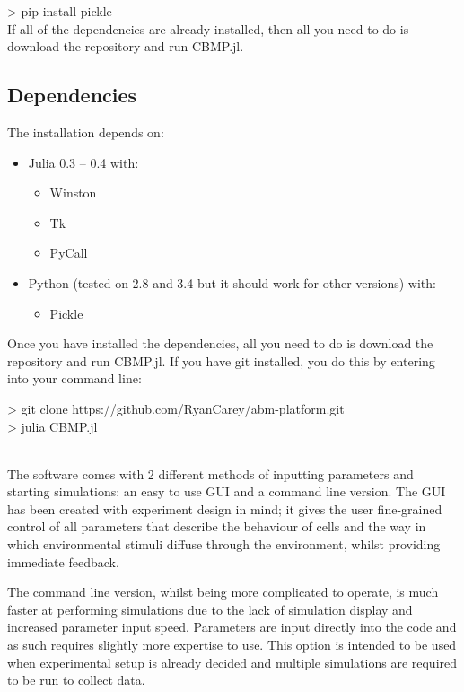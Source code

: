 \documentclass[12pt]{article}
\begin{document}
{\fontsize{11pt}{11pt} \ttfamily 
> pip install pickle} \\

If all of the dependencies are already installed, then all you need to 
do is download the repository and run CBMP.jl.

\subsection{Dependencies}

The installation depends on:

\begin{itemize}
\item Julia 0.3 -- 0.4 with:
\begin{itemize}
\item Winston
\item Tk
\item PyCall
\end{itemize}
\item Python (tested on 2.8 and 3.4 but it should work for other 
versions) with:
\begin{itemize}
\item Pickle
\end{itemize}
\end{itemize}

Once you have installed the dependencies, all you need to do is download 
the repository and run CBMP.jl. If you have git installed, you do this 
by entering into your command line: \\

{\fontsize{11pt}{11pt} \ttfamily 

> git clone https://github.com/RyanCarey/abm-platform.git \\

> julia CBMP.jl} \\

The software comes with 2 different methods of inputting parameters and 
starting simulations: an easy to use GUI and a command line version. The 
GUI has been created with experiment design in mind; it gives the user 
fine-grained control of all parameters that describe the behaviour of 
cells and the way in which environmental stimuli diffuse through the 
environment, whilst providing immediate feedback.

The command line version, whilst being more complicated to operate, is 
much faster at performing simulations due to the lack of simulation 
display and increased parameter input speed. Parameters are input 
directly into the code and as such requires slightly more expertise to 
use. This option is intended to be used when experimental setup is 
already decided and multiple simulations are required to be run to 
collect data.
\end{document}
